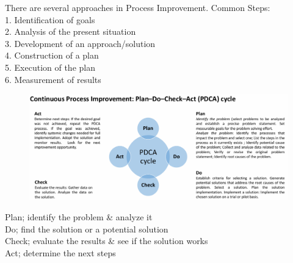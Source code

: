 \documentclass[]{project_plan}
\begin{document}
There are several approaches in Process Improvement. Common Steps:\\
1. Identification of goals \\
2. Analysis of the present situation \\
3. Development of an approach/solution \\
4. Construction of a plan \\
5. Execution of the plan  \\
6. Measurement of results

\begin{figure}[H]
  \centering
  \includegraphics[width=\linewidth]{pdca.png}
\end{figure}

Plan; identify the problem \& analyze it\\
Do; find the solution or a potential solution\\
Check; evaluate the results \& see if the solution works\\
Act; determine the next steps
\end{document}
